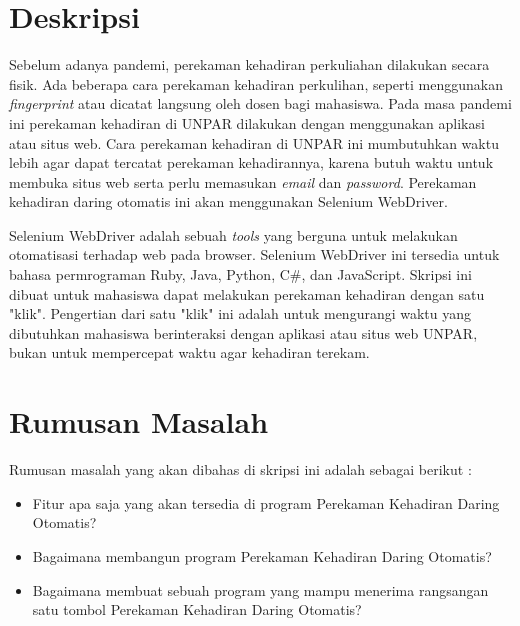 \documentclass[a4paper,twoside]{article}
\begin{document}
\title{\@judultopik}
\author{\nama \textendash \@npm} 

\newcommand{\nama}{Reinalta Sugianto}
\newcommand{\@npm}{2017730035}
\newcommand{\@judultopik}{Perekaman Kehadiran Daring Otomatis} %
\newcommand{\jumpemb}{1} %
\newcommand{\tanggal}{04/10/2021}


\maketitle


\section{Deskripsi}
Sebelum adanya pandemi, perekaman kehadiran perkuliahan dilakukan secara fisik. Ada beberapa cara perekaman kehadiran perkulihan, seperti menggunakan \textit{fingerprint} atau dicatat langsung oleh dosen bagi mahasiswa. Pada masa pandemi ini perekaman kehadiran di UNPAR dilakukan dengan menggunakan aplikasi atau situs web. Cara perekaman kehadiran di UNPAR ini mumbutuhkan waktu lebih agar dapat tercatat perekaman kehadirannya, karena butuh waktu untuk membuka situs web serta perlu memasukan \textit{email} dan \textit{password}. Perekaman kehadiran daring otomatis ini akan menggunakan Selenium WebDriver.

Selenium WebDriver adalah sebuah \textit{tools} yang berguna untuk melakukan otomatisasi terhadap web pada browser. Selenium WebDriver ini tersedia untuk bahasa permrograman Ruby, Java, Python, C\#, dan JavaScript. Skripsi ini dibuat untuk mahasiswa dapat melakukan perekaman kehadiran dengan satu "klik". Pengertian dari satu "klik" ini adalah untuk mengurangi waktu yang dibutuhkan mahasiswa berinteraksi dengan aplikasi atau situs web UNPAR, bukan untuk mempercepat waktu agar kehadiran terekam. 

\section{Rumusan Masalah}
Rumusan masalah yang akan dibahas di skripsi ini adalah sebagai berikut :
\begin{itemize}
	\item Fitur apa saja yang akan tersedia di program Perekaman Kehadiran Daring Otomatis?
	\item Bagaimana membangun program Perekaman Kehadiran Daring Otomatis?
	\item Bagaimana membuat sebuah program yang mampu menerima rangsangan satu tombol Perekaman Kehadiran Daring Otomatis?
	
\end{itemize}
\end{document}
